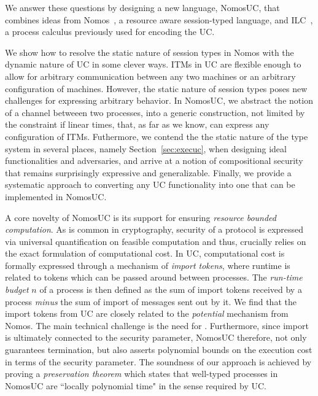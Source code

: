 We answer these questions by designing a new language, NomosUC, that combines ideas from
Nomos~\cite{dasnomos}, a resource aware session-typed language, and ILC~\cite{ilc},
a process calculus previously used for encoding the UC.

We show how to resolve the static nature of session types in Nomos with the dynamic nature of UC in some clever ways. 
ITMs in UC are flexible enough to allow for arbitrary communication between any two machines or an arbitrary configuration of machines.
However, the static nature of session types poses new challenges for expressing arbitrary behavior.
In NomosUC, we abstract the notion of a channel betweeen two processes, into a generic construction, not limited by the constraint
if linear times, that, as far as we know, can express any configuration of ITMs.
Futhermore, we contend the the static nature of the type system in several places, namely Section~\ref{sec:execuc}, when designing ideal functionalities and adversaries,
and arrive at a notion of compositional security that remains surprisingly expressive and generalizable.
Finally, we provide a systematic approach to converting any UC functionality into one that can be implemented in NomosUC.

A core novelty of NomosUC is its support for ensuring \emph{resource bounded computation}.
As is common in cryptography, security of a protocol is expressed via universal quantification
on feasible computation and thus, crucially relies on the exact formulation of computational cost.
In UC, computational cost is formally expressed through a mechanism of \emph{import tokens}, where runtime is related to tokens which can be passed around between processes.
The \emph{run-time budget} $n$ of a process is then defined as the sum of import tokens received by a process \emph{minus} the sum of import of messages sent out by it.
We find that the import tokens from UC are closely related to the \emph{potential} mechanism from Nomos.
The main technical challenge is the need for .
Furthermore, since import is ultimately connected to the security parameter, NomosUC
therefore, not only guarantees termination, but also asserts polynomial bounds on
the execution cost in terms of the security parameter.
The soundness of our approach is achieved by proving a \emph{preservation theorem}
which states that well-typed processes in NomosUC are ``locally polynomial time"
in the sense required by UC.

